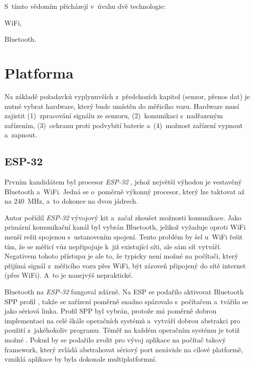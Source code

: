 S~tímto vědomím přicházejí v~úvahu dvě technologie:

\begin{compactenum}
\item WiFi,
\item Bluetooth.
\end{compactenum}

\section{Platforma}
\label{sec:wsm-platforma}

Na základě požadavků vyplynuvších z~předchozích kapitol (senzor, přenos dat)
je nutné vybrat hardware, který bude umístěn do měřicího vozu. Hardware
musí zajistit (1)~zpracování signálu ze senzoru, (2)~komunikaci s~nadřazeným
zařízením, (3)~ochranu proti podvybití baterie a~(4)~možnost zařízení vypnout
a~zapnout.

\subsection{ESP-32}
\label{subsec:wsm-esp32}

Prvním kandidátem byl procesor \textit{ESP-32} \cite{esp-32}, jehož největší
výhodou je vestavěný Bluetooth a~WiFi. Jedná se o~poměrně výkonný procesor,
který lze taktovat až na $240$~MHz, a~to dokonce na dvou jádrech.
\cite{esp-32:datasheet}

Autor pořídil \textit{ESP-32} vývojový kit a~začal zkoušet možnosti komunikace.
Jako primární komunikační kanál byl vybrán Bluetooth, jelikož vyžaduje oproti
WiFi menší režii spojenou s~ustanovením spojení. Tento problém by šel u~WiFi
řešit tím, že se měřicí vůz nepřipojuje k~již existující síti, ale sám síť
vytváří. Negativem tohoto přístupu je ale to, že typicky není možné na
počítači, který přijímá signál z~měřicího vozu přes WiFi, být zároveň připojený
do sítě internet (přes WiFi). A~to je nanejvýš nepraktické.

Bluetooth na \textit{ESP-32} fungoval zdárně. Na ESP se podařilo aktivovat
Bluetooth \gls{SPP} profil \cite{spp:specs}, takže se zařízení poměrně snadno
spárovalo s~počítačem a~tvářilo se jako sériová linka. Profil \gls{SPP} byl
vybrán, protože má poměrně dobrou implementaci na celé škále operačních systémů
a~vytváří dobrou abstrakci pro použití z~jakéhokoliv programu. Téměř na každém
operačním systému je totiž možné . Pokud by se
podařilo zvolit pro vývoj aplikace na počítač takový framework, který zvládá
abstrahovat sériový port nezávisle na cílové platformě, vzniklá aplikace by
byla dokonale multiplatformní.

